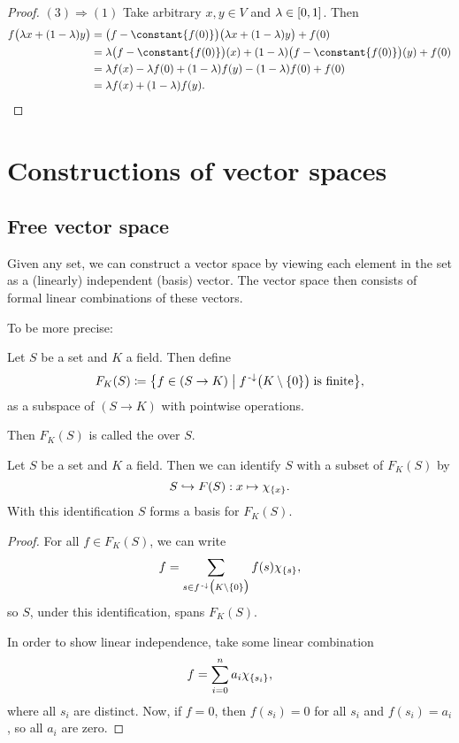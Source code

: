 \begin{proof}
$(3) \Rightarrow (1)$ Take arbitrary $x,y\in V$ and $\lambda\in\interval{0,1}$. Then
\begin{align*}
f\big(\lambda x + (1-\lambda)y\big) &= \big(f - \constant{f(0)}\big)\big(\lambda x + (1-\lambda)y\big) + f(0) \\
&= \lambda\big(f - \constant{f(0)}\big)(x) + (1-\lambda)\big(f - \constant{f(0)}\big)(y) + f(0) \\
&= \lambda f(x) - \lambda f(0) + (1-\lambda)f(y) - (1-\lambda)f(0) + f(0) \\
&= \lambda f(x) + (1-\lambda)f(y).
\end{align*}
\end{proof}

\section{Constructions of vector spaces}
\subsection{Free vector space}
Given any set, we can construct a vector space by viewing each element in the set as a (linearly) independent (basis) vector. The vector space then consists of formal linear combinations of these vectors.

To be more precise:
\begin{definition}
Let $S$ be a set and $K$ a field. Then define
\[ F_K(S) \defeq \setbuilder{f\in(S\to K)}{f^{\preimf}\big(K\setminus\{0\}\big)\;\text{is finite}}, \]
as a subspace of $(S\to K)$ with pointwise operations.

Then $F_K(S)$ is called the  over $S$.
\end{definition}

\begin{proposition} \label{basisFreeVectorSpace}
Let $S$ be a set and $K$ a field. Then we can identify $S$ with a subset of $F_K(S)$ by
\[ S\hookrightarrow F(S): x\mapsto \chi_{\{x\}}. \]
With this identification $S$ forms a basis for $F_K(S)$.
\end{proposition}
\begin{proof}
For all $f\in F_K(S)$, we can write
\[ f = \sum_{s\in f^{{\text{\hspace{0.15em}-}\downarrow}}\big(K\setminus\{0\}\big)}f(s)\chi_{\{s\}}, \]
so $S$, under this identification, spans $F_K(S)$.

In order to show linear independence, take some linear combination
\[ f = \sum_{i=0}^n a_i \chi_{\{s_i\}}, \]
where all $s_i$ are distinct.
Now, if $f = 0$, then $f(s_i) = 0$ for all $s_i$ and $f(s_i) = a_i$, so all $a_i$ are zero.
\end{proof}


